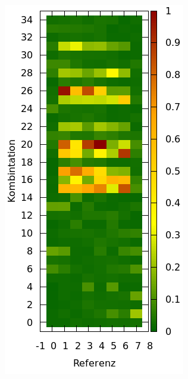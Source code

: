 \begin{figure} [h]
         \centering
         \caption{Analyse der Konditionszahlen gegen die Berechnungsergebnisse eines Messpunktes; Auffällig ist, dass in b) für Referenzantenne 0 und 7 praktisch \textbf{keine} korrekte Lösung existieren. }
         \label{fig:Cond_VS_Results}
%         
         \begin{subfigure}[t]{0.4\textwidth}
                 \centering
                 \includegraphics[width=\textwidth]{common/img/ConditionPlot_scaled.png}

\end{subfigure}
\end{figure}
